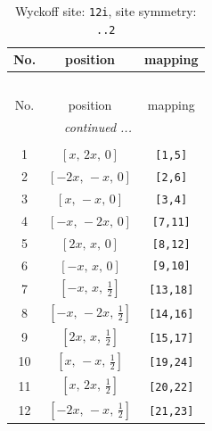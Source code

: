 \documentclass[fleqn,8pt]{jsarticle}
\begin{document}
\begin{longtable}{ccc}
\caption{Wyckoff site: {\tt 12i}, site symmetry: {\tt ..2}}
 \\
 \hline \hline
No. & position & mapping \\ \hline \endfirsthead

\multicolumn{2}{l}{\tablename\ \thetable{}} \\
 \hline \hline
No. & position & mapping \\ \hline \endhead

 \hline \hline
\multicolumn{2}{r}{\footnotesize\it continued ...} \\ \endfoot

 \hline \hline
\multicolumn{2}{r}{} \\ \endlastfoot

1 & $\left[ x,\, 2 x,\, 0 \right]$ & {\tt [1,5]} \\ \hline
2 & $\left[ - 2 x,\, - x,\, 0 \right]$ & {\tt [2,6]} \\ \hline
3 & $\left[ x,\, - x,\, 0 \right]$ & {\tt [3,4]} \\ \hline
4 & $\left[ - x,\, - 2 x,\, 0 \right]$ & {\tt [7,11]} \\ \hline
5 & $\left[ 2 x,\, x,\, 0 \right]$ & {\tt [8,12]} \\ \hline
6 & $\left[ - x,\, x,\, 0 \right]$ & {\tt [9,10]} \\ \hline
7 & $\left[ - x,\, x,\, \frac{1}{2} \right]$ & {\tt [13,18]} \\ \hline
8 & $\left[ - x,\, - 2 x,\, \frac{1}{2} \right]$ & {\tt [14,16]} \\ \hline
9 & $\left[ 2 x,\, x,\, \frac{1}{2} \right]$ & {\tt [15,17]} \\ \hline
10 & $\left[ x,\, - x,\, \frac{1}{2} \right]$ & {\tt [19,24]} \\ \hline
11 & $\left[ x,\, 2 x,\, \frac{1}{2} \right]$ & {\tt [20,22]} \\ \hline
12 & $\left[ - 2 x,\, - x,\, \frac{1}{2} \right]$ & {\tt [21,23]} \\
\end{longtable}
\renewcommand{\arraystretch}{1.2}
\end{document}
